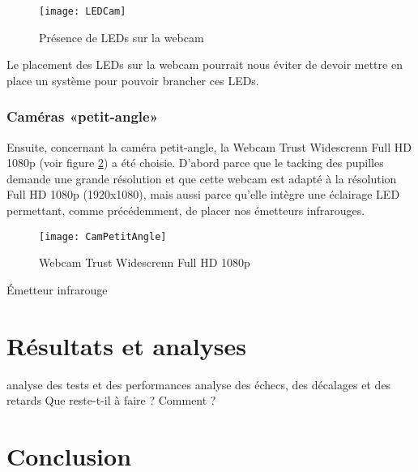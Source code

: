 \begin{figure}[H]
  \centering
  \texttt{[image: LEDCam]}
  \caption{Présence de LEDs sur la webcam}
  \label{fig:LEDCam}
\end{figure}

Le placement des LEDs sur la webcam pourrait nous éviter de devoir mettre en place un système pour pouvoir brancher ces LEDs.


\subsection{Caméras «petit-angle»}

Ensuite, concernant la caméra petit-angle, la Webcam Trust Widescrenn Full HD 1080p (voir figure \ref{fig:CamPetitAngle}) a été choisie. D'abord parce que le tacking des pupilles demande une grande résolution et que cette webcam est adapté à la résolution Full HD 1080p (1920x1080), mais aussi parce qu'elle intègre une éclairage LED permettant, comme précédemment, de placer nos émetteurs infrarouges.

\begin{figure}[H]
  \centering
  \texttt{[image: CamPetitAngle]}
  \caption{Webcam Trust Widescrenn Full HD 1080p}
  \label{fig:CamPetitAngle}
\end{figure}Émetteur infrarouge




\chapter{Résultats et analyses}

analyse des tests et des performances
analyse des échecs, des décalages et des retards
Que reste-t-il à faire ? Comment ?


\chapter{Conclusion}
